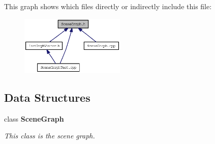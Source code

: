This graph shows which files directly or indirectly include this file:\nopagebreak
\begin{figure}[H]
\begin{center}
\leavevmode
\includegraphics[width=141pt]{SceneGraph_8h__dep__incl}
\end{center}
\end{figure}
\subsection*{Data Structures}
\begin{CompactItemize}
\item 
class {\bf SceneGraph}
\begin{CompactList}\small\item\em This class is the scene graph. \item\end{CompactList}\end{CompactItemize}
